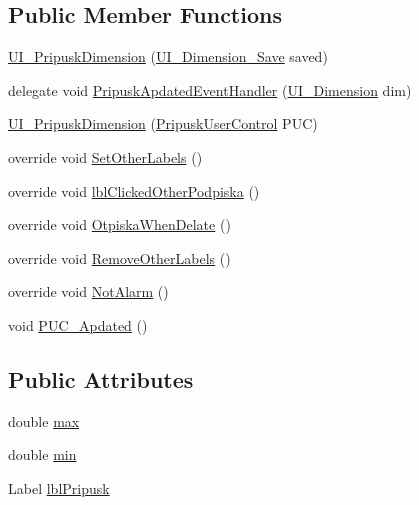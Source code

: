 \subsection*{Public Member Functions}
\begin{DoxyCompactItemize}
\item 
\mbox{\hyperlink{class_dimension___chain_1_1_u_i___pripusk_dimension_a1612d83a462124d01e52eb83ca8ca356}{U\+I\+\_\+\+Pripusk\+Dimension}} (\mbox{\hyperlink{class_dimension___chain_1_1_u_i___dimension___save}{U\+I\+\_\+\+Dimension\+\_\+\+Save}} saved)
\item 
delegate void \mbox{\hyperlink{class_dimension___chain_1_1_u_i___pripusk_dimension_a94481db964cf4a247a289d740f916590}{Pripusk\+Apdated\+Event\+Handler}} (\mbox{\hyperlink{class_dimension___chain_1_1_u_i___dimension}{U\+I\+\_\+\+Dimension}} dim)
\item 
\mbox{\hyperlink{class_dimension___chain_1_1_u_i___pripusk_dimension_abf04d49292432d097fb57c417623f27f}{U\+I\+\_\+\+Pripusk\+Dimension}} (\mbox{\hyperlink{class_dimension___chain_1_1_pripusk_user_control}{Pripusk\+User\+Control}} P\+UC)
\item 
override void \mbox{\hyperlink{class_dimension___chain_1_1_u_i___pripusk_dimension_a38ee5caabaa497743eaae261898d12b1}{Set\+Other\+Labels}} ()
\item 
override void \mbox{\hyperlink{class_dimension___chain_1_1_u_i___pripusk_dimension_a463f62358b9a1c671d3cc8c42dc0b6b2}{lbl\+Clicked\+Other\+Podpiska}} ()
\item 
override void \mbox{\hyperlink{class_dimension___chain_1_1_u_i___pripusk_dimension_a68204a8c2d20a3076f2a3bdd3e9bb97a}{Otpiska\+When\+Delate}} ()
\item 
override void \mbox{\hyperlink{class_dimension___chain_1_1_u_i___pripusk_dimension_a38d5be4b36896a5ad78b93c2194a07ac}{Remove\+Other\+Labels}} ()
\item 
override void \mbox{\hyperlink{class_dimension___chain_1_1_u_i___pripusk_dimension_af95139063be522fb5f68e5e0c9945ed2}{Not\+Alarm}} ()
\item 
void \mbox{\hyperlink{class_dimension___chain_1_1_u_i___pripusk_dimension_ab5c8016816db930abd0dc7526e7f2d55}{P\+U\+C\+\_\+\+Apdated}} ()
\end{DoxyCompactItemize}
\subsection*{Public Attributes}
\begin{DoxyCompactItemize}
\item 
double \mbox{\hyperlink{class_dimension___chain_1_1_u_i___pripusk_dimension_ab8f31817ed2cf42d2d645a4d8eb50746}{max}}
\item 
double \mbox{\hyperlink{class_dimension___chain_1_1_u_i___pripusk_dimension_a9f1f95e1d79a7c132271235057375e25}{min}}
\item 
Label \mbox{\hyperlink{class_dimension___chain_1_1_u_i___pripusk_dimension_af2d6a494ea0d7e35b1288a9caaa21ab2}{lbl\+Pripusk}}
\end{DoxyCompactItemize}

